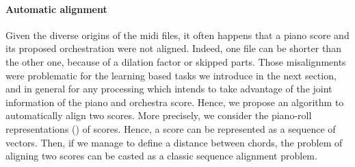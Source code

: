 \documentclass[twoside,twocolumn]{article}
\begin{document}
\paragraph{Automatic alignment}
\label{:automatic-alignment}
Given the diverse origins of the midi files, it often happens that a piano score and its proposed orchestration were not aligned. Indeed, one file can be shorter than the other one, because of a dilation factor or skipped parts.
Those misalignments were problematic for the learning based tasks we introduce in the next section, and in general for any processing which intends to take advantage of the joint information of the piano and orchestra score. Hence, we propose an algorithm to automatically align two scores.
More precisely, we consider the piano-roll representations () of scores. Hence, a score can be represented as a sequence of vectors. Then, if we manage to define a distance between chords, the problem of aligning two scores can be casted as a classic sequence alignment problem.
\end{document}
